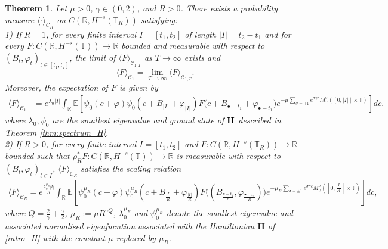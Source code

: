 \documentclass[11pt]{amsart}
\numberwithin{equation}{section}
\newtheorem{theorem}{Theorem}[section]
\theoremstyle{definition}
\renewcommand{\H}{\mathbb{H}}
\newcommand{\R}{\mathbb{R}}
\newcommand{\cjd}{\rangle}
\newcommand{\cjg}{\langle}
\def\H{\mathbf{H}}
\def\E{\mathbb{E}}
\newcommand{\mc}{\mathcal}
\newcommand{\la}{\lambda}
\def\T{\mathbb{T}}
\begin{document}
\begin{theorem} \label{thm: sinh and one pt}
Let $\mu > 0$, $\gamma \in (0,2)$, and $R>0$. There exists a probability measure $\langle \cdot \rangle_{\mc{C}_R}$ on $C(\R,H^{-s}(\T_R))$ satisfying:\\
1) If $R=1$, for every  finite interval $I=[t_1,t_2]$ of length $|I|=t_2-t_1$ and for every $F:C(\R,H^{-s}(\T)) \rightarrow \mathbb{R}$ bounded and measurable with respect to $(B_t,\varphi_t)_{t \in [t_1,t_2]}$, the limit of $\cjg F\cjd_{\mc{C}_{1,T}}$ as $T\to \infty$ exists and 
\[ \cjg F\cjd_{\mc{C}_1} =\lim_{T\to \infty}\cjg F\cjd_{\mc{C}_{1,T}}.\]
Moreover, the expectation of $F$ is given by
\begin{align*}
\langle F \rangle_{\mc{C}_1}
&= 
e^{\lambda_{0} |I| } \int_\R \E[\psi_0(c+\varphi) \psi_0(c+B_{|I|}+\varphi_{|I|}) F\big( c+B_{\bullet -t_1}+\varphi_{\bullet-t_1}\big)  e^{-\mu  \sum_{\sigma = \pm 1} e^{\sigma\gamma c}M_\gamma^\sigma([0,|I|]\times\T)}] dc.
\end{align*} 
where $\la_0,\psi_0$ are the smallest eigenvalue and ground state of ${\bf H}$ described in Theorem \ref{thm:spectrum_H}.\\
2) If $R>0$, for every  finite interval $I=[t_1,t_2]$ and $F:C(\mathbb{R}, H^{-s}(\T_R))\to \mathbb{R}$ bounded such that $\rho_R^*F:C(\mathbb{R}, H^{-s}(\T))\to \mathbb{R}$ is measurable with respect to $(B_t,\varphi_t)_{t \in I}$,  $\langle F \rangle_{\mc{C}_{R}}$ satisfies the scaling relation
\begin{align*}
\langle F \rangle_{\mc{C}_{R}}
=
e^{\frac{\lambda_0^{\mu_R}|I|}{R} } \int_\R \E[\psi_0^{\mu_R}(c+\varphi) \psi^{\mu_R}_0(c+B_{\frac{|I|}R}+\varphi_{\frac{|I|}{R}}) F \big( (B_{\frac{\bullet-t_1}{R}}, \varphi_{\frac{\bullet-t_1}{R}})\big)  e^{-\mu_R \sum_{\sigma = \pm 1} e^{\sigma\gamma c}M_\gamma^\sigma([0,\frac{|I|}R]\times \T)}]dc,
\end{align*} 
where $Q=\frac 2\gamma + \frac \gamma 2$, $\mu_R:=\mu  R^{\gamma Q}$, $\lambda_{0}^{\mu_R}$ and $\psi^{\mu_R}_0$ denote the smallest eigenvalue and associated normalised eigenfucntion associated with the Hamiltonian $\H$ of \eqref{intro_H} with the constant $\mu$ replaced by $\mu_R$.
\end{theorem}
\end{document}
